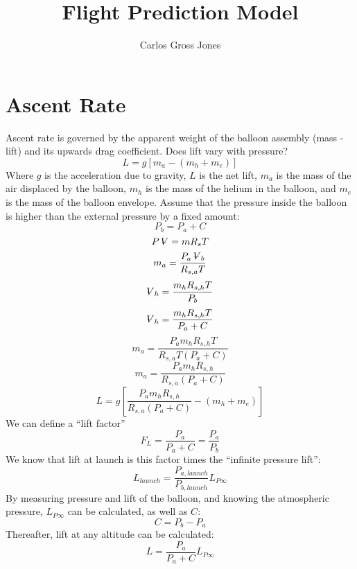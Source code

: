 \documentclass[]{article}
\title{Flight Prediction Model}
\author{Carlos Gross Jones}
\newcommand{\volume}{\mathop{\ooalign{\hfil$V$\hfil\cr\kern0.08em--\hfil\cr}}\nolimits}
\begin{document}
\maketitle

\begin{abstract}

\end{abstract}

\section{Ascent Rate}
\par Ascent rate is governed by the apparent weight of the balloon assembly (mass - lift) and its upwards drag coefficient. Does lift vary with pressure?
\begin{equation}
L=g[m_a-(m_h+m_e)]
\end{equation}
Where $g$ is the acceleration due to gravity, $L$ is the net lift, $m_a$ is the mass of the air displaced by the balloon, $m_h$ is the mass of the helium in the balloon, and $m_e$ is the mass of the balloon envelope.
Assume that the pressure inside the balloon is higher than the external pressure by a fixed amount:
\begin{equation}
P_b=P_a+C
\end{equation}
\begin{equation}
P\volume=mR_sT
\end{equation}
\begin{equation}
m_a=\frac{P_a\volume_b}{R_{s,a}T}
\end{equation}
\begin{equation}
\volume_h=\frac{m_hR_{s,h}T}{P_b}
\end{equation}
\begin{equation}
\volume_h=\frac{m_hR_{s,h}T}{P_a+C}
\end{equation}
\begin{equation}
m_a=\frac{P_am_hR_{s,h}T}{R_{s,a}T(P_a+C)}
\end{equation}
\begin{equation}
m_a=\frac{P_am_hR_{s,h}}{R_{s,a}(P_a+C)}
\end{equation}
\begin{equation}
L=g\left[\frac{P_am_hR_{s,h}}{R_{s,a}(P_a+C)}-(m_h+m_e)\right]
\end{equation}
We can define a ``lift factor''
\begin{equation}
F_L=\frac{P_a}{P_a+C}
=\frac{P_a}{P_b}
\end{equation}
We know that lift at launch is this factor times the ``infinite pressure lift'':
\begin{equation}
L_{launch}=\frac{P_{a,launch}}{P_{b,launch}}L_{P\infty}
\end{equation}
By measuring pressure and lift of the balloon, and knowing the atmospheric pressure, $L_{P\infty}$ can be calculated, as well as $C$:
\begin{equation}
C=P_b-P_a
\end{equation}
Thereafter, lift at any altitude can be calculated:
\begin{equation}
L=\frac{P_a}{P_a+C}L_{P\infty}
\end{equation}
\end{document}
